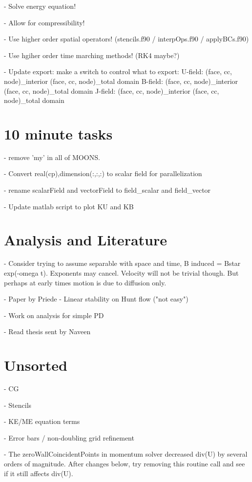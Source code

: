 \documentclass[11pt]{article}
\begin{document}
- Solve energy equation!

- Allow for compressibility!

- Use higher order spatial operators! (stencils.f90 / interpOps.f90 / applyBCs.f90)

- Use hgiher order time marching methods! (RK4 maybe?)

- Update export: make a switch to control what to export:
      U-field: (face, cc, node)\_interior (face, cc, node)\_total domain
      B-field: (face, cc, node)\_interior (face, cc, node)\_total domain
      J-field: (face, cc, node)\_interior (face, cc, node)\_total domain

\section{10 minute tasks}
- remove 'my' in all of MOONS.

- Convert real(cp),dimension(:,:,:) to scalar field for parallelization

- rename scalarField and vectorField to field\_scalar and field\_vector

- Update matlab script to plot KU and KB


\section{Analysis and Literature}
- Consider trying to assume separable with space and time, B induced = Bstar exp(-omega t). Exponents may cancel. Velocity will not be trivial though. But perhaps at early times motion is due to diffusion only.

- Paper by Priede - Linear stability on Hunt flow ("not easy")

- Work on analysis for simple PD

- Read thesis sent by Naveen

\section{Unsorted}

- CG

- Stencils

- KE/ME equation terms

- Error bars / non-doubling grid refinement

- The zeroWallCoincidentPoints in momentum solver decreased div(U) by several orders of magnitude. After changes below, try removing this routine call and see if it still affects div(U).
\end{document}
